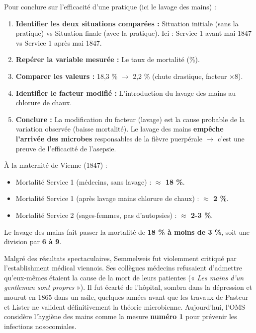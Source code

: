 \documentclass[11pt]{article}
\begin{document}
\begin{methode}
Pour conclure sur l'efficacité d'une pratique (ici le lavage des mains) :
\begin{enumerate}
    \item \textbf{Identifier les deux situations comparées :} Situation initiale (sans la pratique) vs Situation finale (avec la pratique). Ici : Service 1 avant mai 1847 vs Service 1 après mai 1847.
    \item \textbf{Repérer la variable mesurée :} Le taux de mortalité (\%).
    \item \textbf{Comparer les valeurs :} 18,3 \% $\rightarrow$ 2,2 \% (chute drastique, facteur $\times 8$).
    \item \textbf{Identifier le facteur modifié :} L'introduction du lavage des mains au chlorure de chaux.
    \item \textbf{Conclure :} La modification du facteur (lavage) est la cause probable de la variation observée (baisse mortalité). Le lavage des mains \textbf{empêche l'arrivée des microbes} responsables de la fièvre puerpérale $\rightarrow$ c'est une preuve de l'efficacité de l'asepsie.
\end{enumerate}
\end{methode}

\begin{exemplebox}
À la maternité de Vienne (1847) :
\begin{itemize}
    \item Mortalité Service 1 (médecins, sans lavage) : \textbf{$\approx$ 18 \%}.
    \item Mortalité Service 1 (après lavage mains chlorure de chaux) : \textbf{$\approx$ 2 \%}.
    \item Mortalité Service 2 (sages-femmes, pas d'autopsies) : \textbf{$\approx$ 2-3 \%}.
\end{itemize}
Le lavage des mains fait passer la mortalité de \textbf{18 \% à moins de 3 \%}, soit une division par \textbf{6 à 9}.
\end{exemplebox}

\begin{savaistu}
Malgré des résultats spectaculaires, Semmelweis fut violemment critiqué par l'establishment médical viennois. Ses collègues médecins refusaient d'admettre qu'eux-mêmes étaient la cause de la mort de leurs patientes (« \emph{Les mains d'un gentleman sont propres} »). Il fut écarté de l'hôpital, sombra dans la dépression et mourut en 1865 dans un asile, quelques années avant que les travaux de Pasteur et Lister ne valident définitivement la théorie microbienne. Aujourd'hui, l'OMS considère l'hygiène des mains comme la mesure \textbf{numéro 1} pour prévenir les infections nosocomiales.
\end{savaistu}
\end{document}

